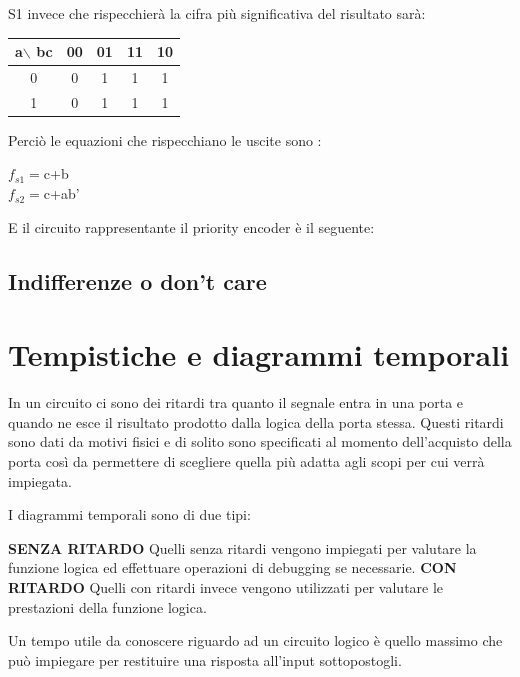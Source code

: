 \documentclass[a4paper]{book}
\begin{document}
S1 invece che rispecchierà la cifra più significativa del risultato sarà:

\begin{tabular}{|c|c|c|c|c|}
a$\backslash$ bc & 00 & 01 & 11 & 10 \\
\hline
0              & 0  & \cellcolor{yellow}1  &  \cellcolor{yellow}1 & \cellcolor{yellow}1  \\
\hline
1              & 0  & \cellcolor{yellow}1  &  \cellcolor{yellow}1 & \cellcolor{yellow}1  \\
\hline

\end{tabular}


Perciò le equazioni che rispecchiano le uscite sono :

\(f_{s1}=\)c+b \\
\(f_{s2}=\)c+ab'


E il circuito rappresentante il priority encoder è il seguente:


\section{Indifferenze o don't care}

\chapter{Tempistiche e diagrammi temporali}

In un circuito ci sono dei ritardi tra quanto il segnale entra in una porta e quando ne esce il risultato prodotto dalla logica della porta stessa.
Questi ritardi sono dati da motivi fisici e di solito sono specificati al momento dell'acquisto della porta così da permettere di scegliere quella più adatta agli scopi per cui verrà impiegata.

I diagrammi temporali sono di due tipi:
 
\textbf{SENZA RITARDO}\newline
Quelli senza ritardi vengono impiegati per valutare la funzione logica ed effettuare operazioni di debugging se necessarie.\newline
\textbf{CON RITARDO}\newline
Quelli con ritardi invece vengono utilizzati per valutare le prestazioni della funzione logica.\newline

Un tempo utile da conoscere riguardo ad un circuito logico è quello massimo che può impiegare per restituire una risposta all'input sottopostogli.
\end{document}
